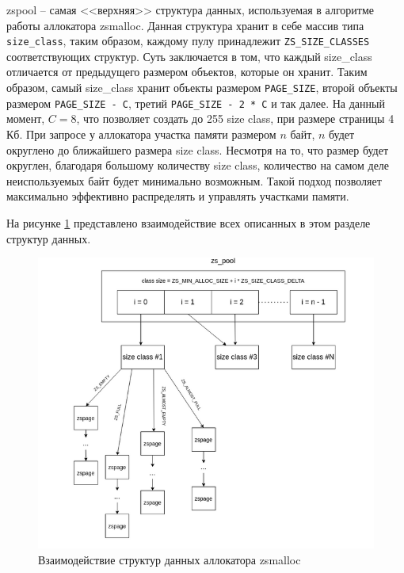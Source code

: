 
zspool -- самая <<верхняя>> структура данных, используемая в алгоритме работы аллокатора zsmalloc. Данная структура хранит в себе массив типа \\ \texttt{size\_class}, таким образом, каждому пулу принадлежит \texttt{ZS\_SIZE\_CLASSES} соответствующих структур. Суть заключается в том, что каждый size\_class отличается от предыдущего размером объектов, которые он хранит. Таким образом, самый size\_class хранит объекты размером \texttt{PAGE\_SIZE}, второй объекты размером \texttt{PAGE\_SIZE - C}, третий \texttt{PAGE\_SIZE - 2 * C} и так далее. На данный момент, $C = 8$, что позволяет создать до 255 size class, при размере страницы 4 Кб. При запросе у аллокатора участка памяти размером $n$ байт, $n$ будет округлено до ближайшего размера size class. Несмотря на то, что размер будет округлен, благодаря большому количеству size class, количество на самом деле неиспользуемых байт будет минимально возможным.  Такой подход позволяет максимально эффективно распределять и управлять участками памяти.

На рисунке \ref{fig:zsmalloc_full} представлено взаимодействие всех описанных в этом разделе структур данных.

\begin{figure}[h]
	\centering
	\includegraphics[width=\textwidth]{img/zsmalloc_full.png}
	\caption{Взаимодействие структур данных аллокатора zsmalloc}
	\label{fig:zsmalloc_full}
\end{figure}

